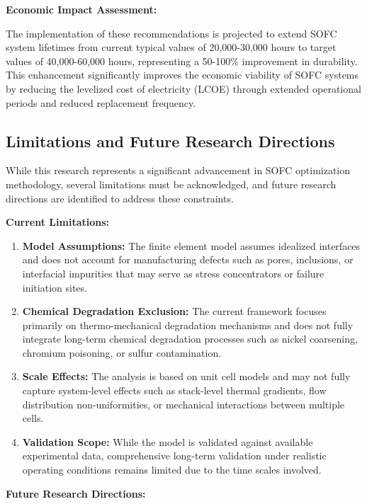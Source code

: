 \documentclass[conference]{IEEEtran}
\begin{document}
\textbf{Economic Impact Assessment:}

The implementation of these recommendations is projected to extend SOFC system lifetimes from current typical values of 20,000-30,000 hours to target values of 40,000-60,000 hours, representing a 50-100\% improvement in durability. This enhancement significantly improves the economic viability of SOFC systems by reducing the levelized cost of electricity (LCOE) through extended operational periods and reduced replacement frequency.

\subsection{Limitations and Future Research Directions}

While this research represents a significant advancement in SOFC optimization methodology, several limitations must be acknowledged, and future research directions are identified to address these constraints.

\textbf{Current Limitations:}

\begin{enumerate}
\item \textbf{Model Assumptions:} The finite element model assumes idealized interfaces and does not account for manufacturing defects such as pores, inclusions, or interfacial impurities that may serve as stress concentrators or failure initiation sites.

\item \textbf{Chemical Degradation Exclusion:} The current framework focuses primarily on thermo-mechanical degradation mechanisms and does not fully integrate long-term chemical degradation processes such as nickel coarsening, chromium poisoning, or sulfur contamination.

\item \textbf{Scale Effects:} The analysis is based on unit cell models and may not fully capture system-level effects such as stack-level thermal gradients, flow distribution non-uniformities, or mechanical interactions between multiple cells.

\item \textbf{Validation Scope:} While the model is validated against available experimental data, comprehensive long-term validation under realistic operating conditions remains limited due to the time scales involved.
\end{enumerate}

\textbf{Future Research Directions:}
\end{document}
